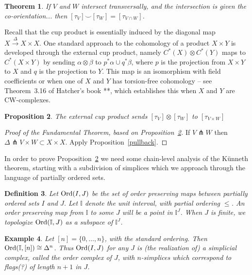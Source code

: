 \documentclass{amsart}          %
\newtheorem{theorem}{Theorem}[section]
\newtheorem{proposition}[theorem]{Proposition}
\newtheorem{definition}[theorem]{Definition}
\newtheorem{example}[theorem]{Example}
\newcommand{\I}{\mathbb I}
\begin{document}
\begin{theorem}
If $V$ and $W$ intersect transversally, and the intersection is given the co-orientation... then $[\tau_{V}] \smile [\tau_W] = [\tau_{V \cap W}]$.
\end{theorem}

Recall that the cup product is essentially induced by the diagonal map $X \overset{\Delta}{\to} X \times X$.  One standard
approach to the cohomology of a product $X \times Y$ is developed through the external cup product, namely $C^*(X) \otimes C^*(Y)$
maps to $C^*(X \times Y)$ by sending $\alpha  \otimes \beta$ to $p^* \alpha \cup q^*\beta$, where $p$ is the projection from 
$X \times Y$ to $X$ and $q$ is the projection to $Y$.  This map is an isomorphism with field coefficients or when 
one of $X$ and $Y$ has torsion-free cohomology -- see Theorem~3.16 of Hatcher's book **, which establishes this when $X$ and
$Y$ are CW-complexes.

\begin{proposition}\label{externalcup}
The external cup product sends $[\tau_V] \otimes [\tau_W]$ to $[\tau_{V \times W}]$
\end{proposition}

\begin{proof}[Proof of the Fundamental Theorem, based on Proposition~\ref{externalcup}]
If $V \pitchfork W$ then $\Delta \pitchfork V \times W \subset X \times X$.  Apply Proposition~\ref{pullback}.
\end{proof}


In order to prove Proposition~\ref{externalcup} we need some chain-level analysis of the K\"unneth theorem, starting with 
a subdivision of simplices which we approach through the language of partially ordered sets.

\begin{definition}
Let ${\rm Ord}(I,J)$ be the set of order preserving maps between partially ordered sets $I$ and $J$.  Let $\I$ denote the unit interval,
with partial ordering $\leq$.  An order preserving map from $\I$ to some $J$ will be a point in  $\I^J$.  When $J$ is finite, we topologize
${\rm Ord}(\I, J)$ as a subspace of $\I^J$.
\end{definition}

\begin{example}
Let $[n] = \{0, \ldots, n\}$, with the standard ordering.  Then ${\rm Ord}(\I, [n]) \cong \Delta^n$.  Thus  ${\rm Ord}(I,J)$ for any $J$
is (the realization of) a simplicial complex, called the order complex of $J$, with $n$-simplices which correspond to flags(?)
of length $n + 1$ in $J$.
\end{example}
\end{document}
